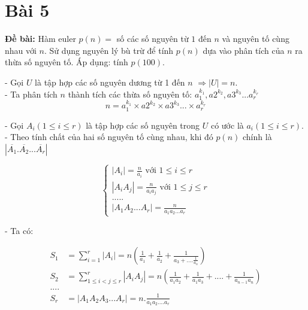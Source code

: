 \documentclass[12pt]{article}
\begin{document}
\begin{sloppypar}
\section{Bài 5}
\begin{tcolorbox}
    \textbf{Đề bài:} Hàm euler \(p(n)=\) số các số nguyên từ \(1\) đến \(n\) và nguyên tố cùng nhau với \(n\). Sử dụng nguyên lý bù trừ để tính \(p(n)\) dựa vào phân tích của \(n\) ra thừa số nguyên tố. Áp dụng: tính \(p(100)\).
\end{tcolorbox}

- Gọi \(U\) là tập hợp các số nguyên dương từ 1 đến \(n\) \(\Rightarrow |U| = n\). \\
- Ta phân tích \(n\) thành tích các thừa số nguyên tố: \(a_{1}^{k_{1}},a{2}^{k_{2}}, a{3}^{k_{3}}...a_{r}^{k_{r}}\) \\
\begin{equation*}
    n = a_{1}^{k_{1}} \times a{2}^{k_{2}} \times a{3}^{k_{3}}... \times a_{r}^{k_{r}}
\end{equation*}

- Gọi \(A_{i} (1 \leq i \leq r)\) là tập hợp các số nguyên trong \(U\) có ước là \(a_{i} (1 \leq i \leq r)\). \\
- Theo tính chất của hai số nguyên tố cùng nhau, khi đó \(p(n)\) chính là \(|\overline{A_{1}}.\overline{A_{2}}...\overline{A_{r}}|\) 

\[
    \begin{cases}
        |A_{i}| = \frac{n}{a_{i}} \text{ với } 1 \leq i \leq r \\
        |A_{i}A_{j}| = \frac{n}{a_{i}a_{j}} \text{ với } 1 \leq j \leq r \\
        ..... \\
        |A_{1}A_{2}...A_{r}| = \frac{n}{a_{1}a_{2}...a_{r}}
    \end{cases}
    \]

- Ta có:

\begin{align*}
    S_{1} & = \sum_{i=1}^{r}|A_{i}| = n\left(\frac{1}{a_{1}} + \frac{1}{a_{2}} + \frac{1}{a_{3} + ....\frac{1}{a_{n}}}\right) \\
    S_{2} & = \sum_{1 \leq i < j \leq r}^{r}|A_{i}A_{j}| = n\left(\frac{1}{a_{1}a_{2}} + \frac{1}{a_{1}a_{3}} + .... + \frac{1}{a_{n-1}a_{n}}\right) \\
    .... \\
    S_{r} & = |A_{1}A_{2}A_{3}...A_{r}| = n.\frac{1}{a_{1}a_{2}....a_{r}}
\end{align*}



\end{sloppypar}
\end{document}
